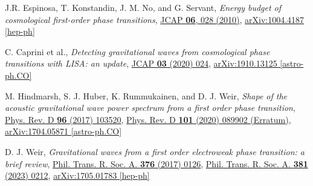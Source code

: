 \documentclass[10pt]{article}
\begin{document}
\begin{thebibliography}{9}

    J.R. Espinosa, T. Konstandin, J. M. No, and G. Servant,
    \textit{Energy budget of cosmological first-order phase transitions},
    \href{https://doi.org/10.1088/1475-7516/2010/06/028}{JCAP \textbf{06}, 028 (2010)},
    \href{https://doi.org/10.48550/arXiv.1004.4187}{arXiv:1004.4187 [hep-ph]}

    C. Caprini et al.,
    \textit{Detecting gravitational waves from cosmological phase transitions with LISA: an update},
    \href{https://doi.org/10.1088/1475-7516/2020/03/024}{JCAP \textbf{03} (2020) 024},
    \href{https://doi.org/10.48550/arXiv.1910.13125}{arXiv:1910.13125 [astro-ph.CO]}

    M. Hindmarsh, S. J. Huber, K. Rummukainen, and D. J. Weir,
    \textit{Shape of the acoustic gravitational wave power spectrum from a first order phase transition},
    \href{https://doi.org/10.1103/PhysRevD.96.103520}{Phys. Rev. D \textbf{96} (2017) 103520},
    \href{https://doi.org/10.1103/PhysRevD.101.089902}{Phys. Rev. D \textbf{101} (2020) 089902 (Erratum)},
    \href{https://doi.org/10.48550/arXiv.1704.05871}{arXiv:1704.05871 [astro-ph.CO]}

    D. J. Weir,
    \textit{Gravitational waves from a first order electroweak phase transition: a brief review},
    \href{https://doi.org/10.1098/rsta.2017.0126}{Phil. Trans. R. Soc. A. \textbf{376} (2017) 0126},
    \href{https://doi.org/10.1098/rsta.2023.0212}{Phil. Trans. R. Soc. A. \textbf{381} (2023) 0212},
    \href{https://doi.org/10.48550/arXiv.1705.01783}{arXiv:1705.01783 [hep-ph]}

\end{thebibliography}
\end{document}
